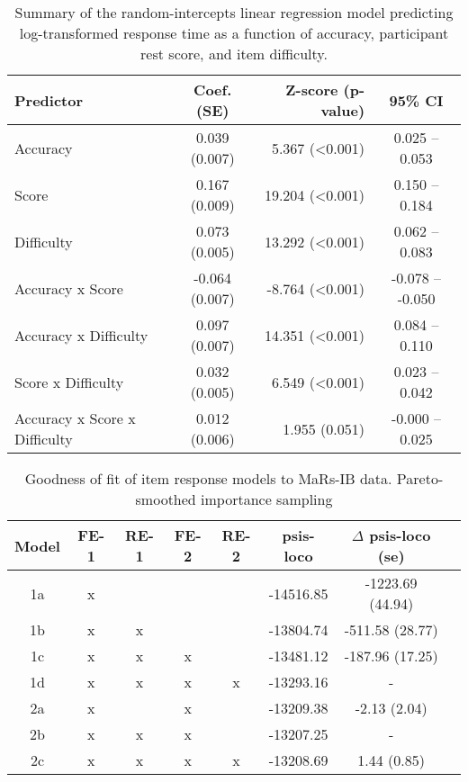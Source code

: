 \documentclass[a4paper,man,natbib]{apa6}
\begin{document}
\begin{table}[]
\centering
\begin{tabular*}{\textwidth}{lc@{\hskip 6mm}r@{\hskip 6mm}c}
\toprule
Predictor &  Coef. (SE) & Z-score (p-value) & 95\% CI  \\
\midrule
Accuracy & 0.039 (0.007) &   5.367 (<0.001) &  0.025 -- 0.053  \\
Score &  0.167 (0.009) &  19.204 (<0.001) &  0.150 -- 0.184  \\
Difficulty & 0.073 (0.005) &  13.292 (<0.001) &  0.062 -- 0.083  \\
Accuracy x Score & -0.064 (0.007) &  -8.764 (<0.001) & -0.078 -- -0.050  \\
Accuracy x Difficulty & 0.097 (0.007) &  14.351 (<0.001) &  0.084 -- 0.110  \\
Score x Difficulty &  0.032 (0.005) &   6.549 (<0.001) &  0.023 -- 0.042  \\
Accuracy x Score x Difficulty &  0.012 (0.006) & 1.955 (0.051) & -0.000 -- 0.025  \\
\bottomrule
\end{tabular*}
\caption{\label{table:1}\normalfont Summary of the random-intercepts linear regression model predicting log-transformed response time as a function of accuracy, participant rest score, and item difficulty.}
\end{table}

\begin{table}
    \centering
    \begin{tabular*}{\textwidth}{cccccccc}
    \toprule
    Model & FE-1 & RE-1 & FE-2 & RE-2 & psis-loco & $\Delta$ psis-loco (se) \\
    \midrule
    1a & x &   &   &   & -14516.85 & -1223.69 (44.94)\\
    1b & x & x &   &   & -13804.74 & -511.58 (28.77) \\
    1c & x & x & x &   & -13481.12 & -187.96 (17.25) \\
    1d & x & x & x & x & -13293.16 & - \\
    \midrule
    2a & x &   & x &   & -13209.38 & -2.13 (2.04) \\
    2b & x & x & x &   & -13207.25 & - \\
    2c & x & x & x & x & -13208.69 & 1.44 (0.85) \\
    \bottomrule
    \end{tabular*}
    \caption{\label{tab:2} \normalfont Goodness of fit of item response models to MaRs-IB data. Pareto-smoothed importance sampling}
    \label{table:2}
\end{table}
\end{document}
